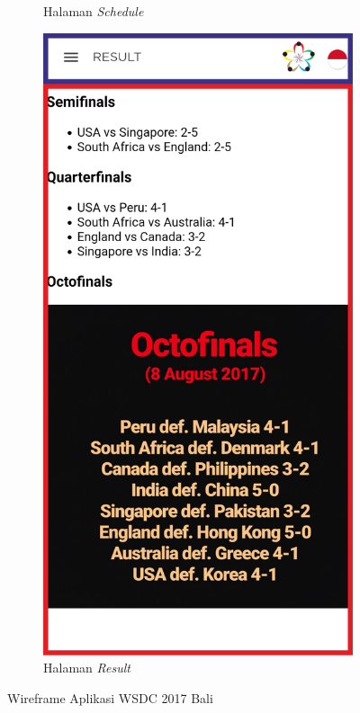 \begin{itemize}
\begin{figure}[H]
\begin{subfigure}[b]{0.247\textwidth}
	    \caption{Halaman {\it Schedule}}
	    \label{fig:SchedulePageWireframe}
     \end{subfigure}
	\begin{subfigure}[b]{0.247\textwidth}
    \centering
	    \includegraphics[scale=0.4]{Gambar/ResultPageWireframe.png}
	    \caption{Halaman {\it Result}}
	    \label{fig:ResultPageWireframe}
     \end{subfigure}
	\caption{Wireframe Aplikasi WSDC 2017 Bali}
        \label{fig:three graphs}
\end{figure}


\end{itemize}
